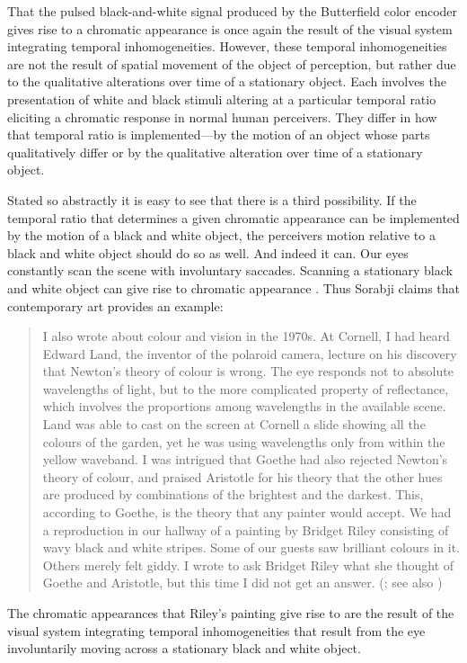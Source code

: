 That the pulsed black-and-white signal produced by the Butterfield color encoder gives rise to a chromatic appearance is once again the result of the visual system integrating temporal inhomogeneities. However, these temporal inhomogeneities are not the result of spatial movement of the object of perception, but rather due to the qualitative alterations over time of a stationary object. Each involves the presentation of white and black stimuli altering at a particular temporal ratio eliciting a chromatic response in normal human perceivers. They differ in how that temporal ratio is implemented---by the motion of an object whose parts qualitatively differ or by the qualitative alteration over time of a stationary object. 

Stated so abstractly it is easy to see that there is a third possibility. If the temporal ratio that determines a given chromatic appearance can be implemented by the motion of a black and white object, the perceivers motion relative to a black and white object should do so as well. And indeed it can. Our eyes constantly scan the scene with involuntary saccades. Scanning a stationary black and white object can give rise to chromatic appearance \citep[72]{Hardin:1993kn}. Thus Sorabji claims that contemporary art provides an example:
\begin{quote}
    I also wrote about colour and vision in the 1970s. At Cornell, I had heard Edward Land, the inventor of the polaroid camera, lecture on his discovery that Newton’s theory of colour is wrong. The eye responds not to absolute wavelengths of light, but to the more complicated property of reflectance, which involves the proportions among wavelengths in the available scene. Land was able to cast on the screen at Cornell a slide showing all the colours of the garden, yet he was using wavelengths only from within the yellow waveband. I was intrigued that Goethe had also rejected Newton’s theory of colour, and praised Aristotle for his theory that the other hues are produced by combinations of the brightest and the darkest. This, according to Goethe, is the theory that any painter would accept. We had a reproduction in our hallway of a painting by Bridget Riley consisting of wavy black and white stripes. Some of our guests saw brilliant colours in it. Others merely felt giddy. I wrote to ask Bridget Riley what she thought of Goethe and Aristotle, but this time I did not get an answer. (\citealt[13]{Sorabji:2005fk}; see also \citealt[295]{Sorabji:2022qf})
\end{quote}
The chromatic appearances that Riley's painting give rise to  are the result of the visual system integrating temporal inhomogeneities that result from the eye involuntarily moving across a stationary black and white object.

